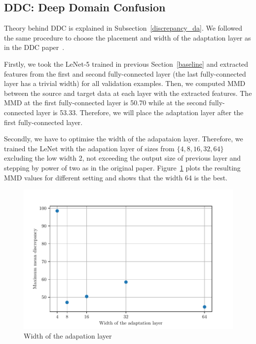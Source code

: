 \subsection{DDC: Deep Domain Confusion}

Theory behind DDC is explained in Subsection~\ref{discrepancy_da}.
We followed the same procedure to choose the placement and width
of the adaptation layer as in the DDC paper~\cite{tzeng2014}.

Firstly, we took the LeNet-5 trained in previous Section~\ref{baseline}
and extracted features from the first and second fully-connected layer
(the last fully-connected layer has a trivial width)
for all validation examples.
Then, we computed MMD between the source and target data at each layer with the extracted features.
The MMD at the first fully-connected layer is 50.70
while at the second fully-connected layer is 53.33.
Therefore, we will place the adaptation layer after the first fully-connected layer.

Secondly, we have to optimise the width of the adapataion layer.
Therefore, we trained the LeNet with the adapation layer of sizes
from \(\{4, 8, 16, 32, 64\}\) excluding the low width 2,
not exceeding the output size of previous layer
and stepping by power of two as in the original paper.
Figure~\ref{adaptation_layer} plots the resulting MMD values for different setting and shows that the width 64 is the best.

\begin{figure}
	\includegraphics[width=\textwidth]{img/adaptation_layer_width.pdf}
	\caption{Width of the adapation layer}
	\label{adaptation_layer}
\end{figure}

